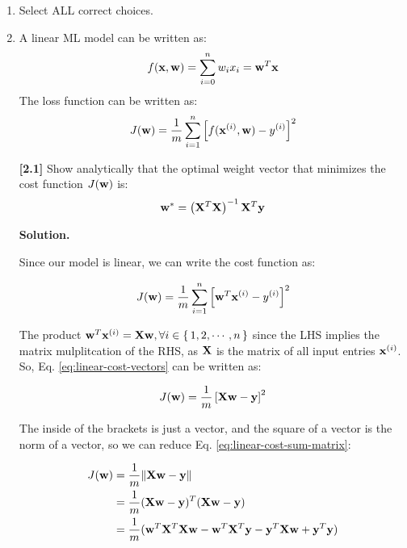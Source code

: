 \documentclass[11pt]{article}
\begin{document}

\begin{enumerate}[start=1,label={\bfseries Question \arabic*:},leftmargin=1in] %

    \item Select ALL correct choices.

    \item A linear ML model can be written as: \[f(\vb{x}, \vb{w}) = \sum_{i=0}^n w_i x_i = \vb{w}^T \vb{x}\] The loss function can be written as: \[ J(\vb{w}) = \frac{1}{m} \sum_{i=1}^n \left[ f(\vb{x}^{(i)}, \vb{w}) - y^{(i)} \right]^2 \]

        \textbf{[2.1]} Show analytically that the optimal weight vector that minimizes the cost function \(J(\vb{w})\) is: \[\vb{w}^* = \left( \vb{X}^T\vb{X}  \right)^{-1} \vb{X}^T\vb{y} \]

        \noindent \textbf{Solution.}

        \noindent Since our model is linear, we can write the cost function as:

        \begin{equation}
            J(\vb{w}) = \frac{1}{m} \sum_{i=1}^n \left[ \vb{w}^T \vb{x}^{(i)} - y^{(i)} \right]^2
            \label{eq:linear-cost-vectors}
        \end{equation}

        The product \(\vb{w}^T \vb{x}^{(i)} = \vb{Xw}, \forall i \in \set{1, 2, \cdots, n}\) since the LHS implies the matrix mulplitcation of the RHS, as \(\vb{X}\) is the matrix of all input entries \(\vb{x}^{(i)}\). So, Eq. \ref{eq:linear-cost-vectors} can be written as:

        \begin{equation}
            J(\vb{w}) = \frac{1}{m} \left[ \vb{Xw}  - \vb{y} \right]^2
            \label{eq:linear-cost-sum-matrix}
        \end{equation}

        The inside of the brackets is just a vector, and the square of a vector is the norm of a vector, so we can reduce Eq. \ref{eq:linear-cost-sum-matrix}:

        \begin{align}
            J(\vb{w}) &= \frac{1}{m} \norm{ \vb{Xw} - \vb{y}  } \\
                      &= \frac{1}{m} (\vb{Xw} - \vb{y})^T(\vb{Xw} - \vb{y}) \\
                      &= \frac{1}{m} ( \vb{w}^T\vb{X}^T\vb{Xw} - \vb{w}^T\vb{X}^T\vb{y} - \vb{y}^T \vb{Xw} + \vb{y}^T\vb{y} )
        \end{align}


\end{enumerate}
\end{document}
